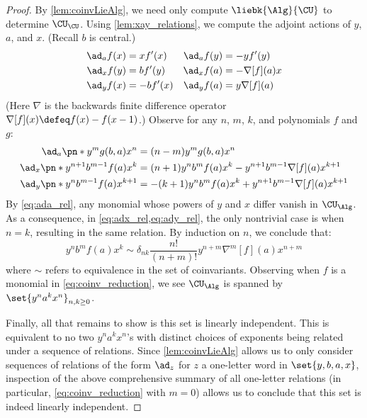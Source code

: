 \begin{proof}
By \cref{lem:coinvLieAlg}, we need only compute $\liebk{\Alg}{\CU}$ to
determine $\CU_\CU$. Using \cref{lem:xay_relations}, we compute the adjoint
actions of $y$, $a$, and $x$. (Recall $b$ is central.)
\begin{align}
  \ad_a f(x) &= xf'(x)&
  \ad_a f(y) &= -yf'(y)\label{eq:ada}\\
  \ad_x f(y) &= bf'(y) &
  \ad_x f(a) &= -\nabla[f](a)x\label{eq:adx}\\
  \ad_y f(x) &= -bf'(x) &
  \ad_y f(a) &= y\nabla[f](a)\label{eq:ady}
\end{align}
(Here $\nabla$ is the backwards finite difference operator $\nabla[f](x) \defeq
f(x) - f(x-1)$.) Observe for any $n$, $m$, $k$, and polynomials $f$ and $g$:
\begin{align}
        \ad_a \pn*{y^m g(b, a) x^n } &= (n-m)y^mg(b, a) x^n
        \label{eq:ada_rel}\\
        \ad_{x}\pn*{y^{n+1}b^{m-1}f(a)x^{k}} &=
                (n+1)y^{n}b^{m}f(a)x^{k} - y^{n+1}b^{m-1}\nabla[f](a)x^{k+1}
        \label{eq:adx_rel}\\
        \ad_{y}\pn*{y^n b^{m-1} f(a) x^{k+1}} &=
                - (k+1)y^n b^m f(a) x^k + y^{n+1} b^{m-1} \nabla[f](a)x^{k+1}
        \label{eq:ady_rel}
\end{align}
By \cref{eq:ada_rel}, any monomial whose powers of $y$ and $x$ differ vanish in
$\CU_{\Alg}$. As a consequence, in \cref{eq:adx_rel,eq:ady_rel}, the only
nontrivial case is when $n=k$, resulting in the same relation. By induction on
$n$, we conclude that:
\begin{equation}\label{eq:coinv_reduction}
        y^n b^m f(a) x^k \sim δ_{nk}\frac{n!}{(n+m)!}y^{n+m}\nabla^m[f](a)x^{n+m}
\end{equation}
where $\sim$ refers to equivalence in the set of coinvariants. Observing when
$f$ is a monomial in \cref{eq:coinv_reduction}, we see $\CU_{\Alg}$ is spanned
by $\set{y^n a^k x^n}_{n, k \ge 0}$.

Finally, all that remains to show is this set is linearly independent. This is
equivalent to no two $y^na^kx^n$'s with distinct choices of exponents being
related under a sequence of relations. Since \cref{lem:coinvLieAlg} allows us to
only consider sequences of relations of the form $\ad_z$ for $z$ a one-letter
word in $\set{y, b, a, x}$, inspection of the above comprehensive summary of all
one-letter relations (in particular, \cref{eq:coinv_reduction} with $m=0$)
allows us to conclude that this set is indeed linearly independent.
\end{proof}

